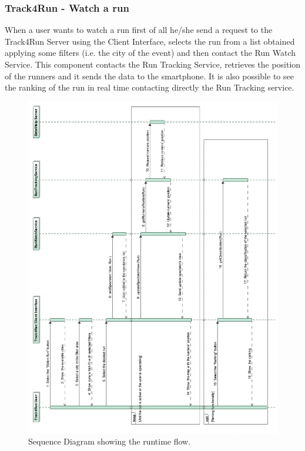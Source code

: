 \documentclass[a4paper]{article}
\begin{document}
\subsubsection{Track4Run - Watch a run}
When a user wants to watch a run first of all he/she send a request to the Track4Run Server using the Client Interface, selects the run from a list obtained applying some filters (i.e. the city of the event) and then contact the Run Watch Service. This component contacts the Run Tracking Service, retrieves the position of the runners and it sends the data to the smartphone. It is also possible to see the ranking of the run in real time contacting directly the Run Tracking service.

\begin{figure}[H]
    \centering
    \includegraphics[width=\linewidth]{SequenceDiagram-SpectateARunEvent}
    \caption{Sequence Diagram showing the runtime flow.}
    \label{fig:my_label}
\end{figure}
\clearpage
\end{document}
